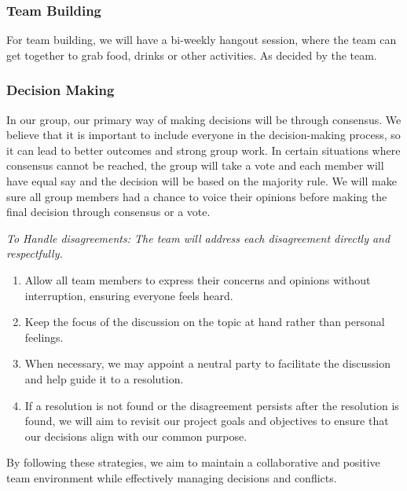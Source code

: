 \documentclass{article}
\begin{document}
\subsubsection*{Team Building}

For team building, we will have a bi-weekly hangout session, where the team can get together to grab food, drinks or other activities. As decided by the team.
\subsubsection*{Decision Making}

In our group, our primary way of making decisions will be through
consensus. We believe that it is important
to include everyone in the decision-making process, so it can lead to
better outcomes and strong group work.
In certain situations where consensus cannot be reached, the group
will take a vote and each member will have
equal say and the decision will be based on the majority rule. We
will make sure all group members had a chance
to voice their opinions before making the final decision through
consensus or a vote.

\vspace{10pt}
\textit{To Handle disagreements: The team will address each
disagreement directly and respectfully.}

\begin{enumerate}
  \item Allow all team members to express their concerns and opinions
    without interruption, ensuring everyone
    feels heard.
  \item Keep the focus of the discussion on the topic at hand rather
    than personal feelings.
  \item When necessary, we may appoint a neutral party to facilitate
    the discussion and help guide it to a resolution.
  \item If a resolution is not found or the disagreement persists
    after the resolution is found, we will aim to
    revisit our project goals and objectives to ensure that our
    decisions align with our common purpose.
\end{enumerate}
By following these strategies, we aim to maintain a collaborative and
positive team environment while effectively
managing decisions and conflicts.
\end{document}
